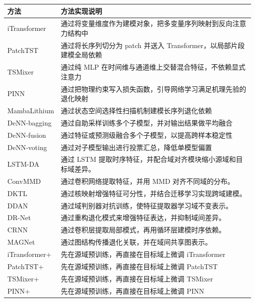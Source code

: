 \documentclass[printcopy,fontset=windows]{../Style/neuthesis}
\begin{document}
\begin{table}[p]
  \centering
  \label{tab:rodtnet_methods}
  \begin{threeparttable}
    \scriptsize
    \begin{tabularx}{\textwidth}{>{\raggedright\arraybackslash}p{}Z}
      \toprule
      方法 & 方法实现说明 \\
      \midrule
      iTransformer &
      通过将变量维度作为建模对象，把多变量序列映射到反向注意力结构中 \\
      PatchTST &
      通过将长序列切分为 patch 并送入 Transformer，以局部片段建模全局依赖 \\
      TSMixer &
      通过纯 MLP 在时间维与通道维上交替混合特征，不依赖显式注意力 \\
      PINN &
      通过把物理约束写入损失函数，引导网络学习满足机理先验的退化映射 \\
      MambaLithium &
      通过状态空间选择性扫描机制建模长序列退化依赖 \\
      DeNN-bagging &
      通过自助采样训练多个子模型，并对输出结果做平均融合 \\
      DeNN-fusion &
      通过特征或预测级融合多个子模型，以提高跨样本稳定性 \\
      DeNN-voting &
      通过对子模型输出进行投票汇总，降低单模型偏置 \\
      LSTM-DA &
      通过 LSTM 提取时序特征，并配合域对齐模块缩小源域和目标域差异。 \\
      ConvMMD &
      通过卷积网络提取特征，并用 MMD 对齐不同域的分布。 \\
      DKTL &
      通过核映射增强特征可分性，并结合迁移学习实现跨域建模。 \\
      DDAN &
      通过域判别器对抗训练，使特征提取器学习域不变表示。 \\
      DR-Net &
      通过重构退化模式来增强特征表达，并抑制域间差异。 \\
      CRNN &
      通过卷积层提取局部模式，再用循环层建模时序依赖。 \\
      MAGNet &
      通过图结构传播退化关联，并在域间共享图表示。 \\
      iTransformer+ &
      先在源域预训练，再直接在目标域上微调 iTransformer \\
      PatchTST+ &
      先在源域预训练，再直接在目标域上微调 PatchTST \\
      TSMixer+ &
      先在源域预训练，再直接在目标域上微调 TSMixer \\
      PINN+ &
      先在源域预训练，再直接在目标域上微调 PINN \\
      \bottomrule
    \end{tabularx}
  \end{threeparttable}
\end{table}
\clearpage
\end{document}
